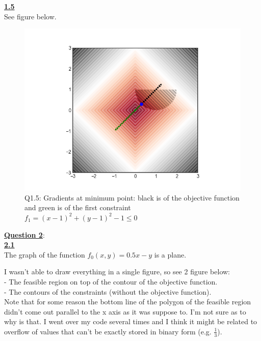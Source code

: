 \documentclass[fleqn]{article}
\begin{document}
\underline{\textbf{1.5}} \\
See figure below. \\

\begin{figure}[h!]
\includegraphics[width=0.8\linewidth]{q1_5.PNG}
\caption{Q1.5: Gradients at minimum point: black is of the objective function and green is of the first constraint $f_1 = (x-1)^2+(y-1)^2-1 \leq 0$}
\end{figure}




\clearpage\underline{\textbf{Question 2}}:\\
\underline{\textbf{2.1}} \\
The graph of the function $f_0(x,y) = 0.5x-y$ is a plane.

I wasn't able to draw everything in a single figure, so see 2 figure below:\\
- The feasible region on top of the contour of the objective function. \\
- The contours of the constraints (without the objective function). \\

Note that for some reason the bottom line of the polygon of the feasible region didn't come out parallel to the x axis as it was suppose to. I'm not sure as to why is that. I went over my code several times and I think it might be related to overflow of values that can't be exactly stored in binary form (e.g. $\frac{1}{3}$).\\
\end{document}
